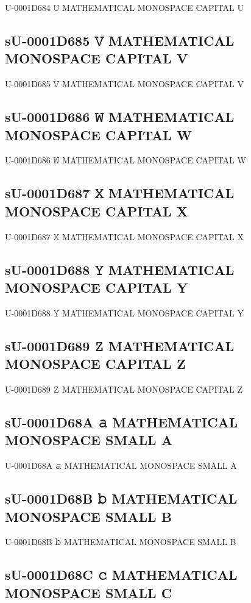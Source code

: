 U-0001D684 𝚄 MATHEMATICAL MONOSPACE CAPITAL U

\subsection{sU-0001D685 𝚅 MATHEMATICAL MONOSPACE CAPITAL V}

U-0001D685 𝚅 MATHEMATICAL MONOSPACE CAPITAL V

\subsection{sU-0001D686 𝚆 MATHEMATICAL MONOSPACE CAPITAL W}

U-0001D686 𝚆 MATHEMATICAL MONOSPACE CAPITAL W

\subsection{sU-0001D687 𝚇 MATHEMATICAL MONOSPACE CAPITAL X}

U-0001D687 𝚇 MATHEMATICAL MONOSPACE CAPITAL X

\subsection{sU-0001D688 𝚈 MATHEMATICAL MONOSPACE CAPITAL Y}

U-0001D688 𝚈 MATHEMATICAL MONOSPACE CAPITAL Y

\subsection{sU-0001D689 𝚉 MATHEMATICAL MONOSPACE CAPITAL Z}

U-0001D689 𝚉 MATHEMATICAL MONOSPACE CAPITAL Z

\subsection{sU-0001D68A 𝚊 MATHEMATICAL MONOSPACE SMALL A}

U-0001D68A 𝚊 MATHEMATICAL MONOSPACE SMALL A

\subsection{sU-0001D68B 𝚋 MATHEMATICAL MONOSPACE SMALL B}

U-0001D68B 𝚋 MATHEMATICAL MONOSPACE SMALL B

\subsection{sU-0001D68C 𝚌 MATHEMATICAL MONOSPACE SMALL C}

